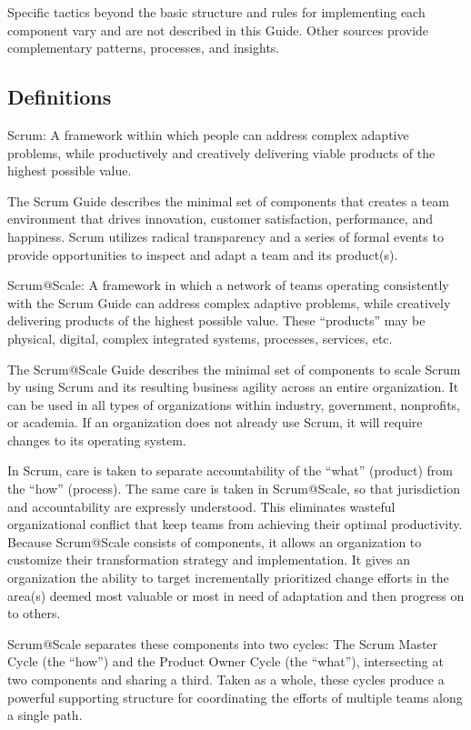 \documentclass[12pt,a4paper,parskip=full]{scrartcl}
\begin{document}
Specific tactics beyond the basic structure and rules for implementing
each component vary and are not described in this Guide. Other sources
provide complementary patterns, processes, and insights.

\subsection{Definitions}\label{definitions}

Scrum: A framework within which people can address complex adaptive
problems, while productively and creatively delivering viable products
of the highest possible value.

The Scrum Guide describes the minimal set of components that creates a
team environment that drives innovation, customer satisfaction,
performance, and happiness. Scrum utilizes radical transparency and a
series of formal events to provide opportunities to inspect and adapt a
team and its product(s).

Scrum@Scale: A framework in which a network of teams operating
consistently with the Scrum Guide can address complex adaptive problems,
while creatively delivering products of the highest possible value.
These ``products'' may be physical, digital, complex integrated systems,
processes, services, etc.

The Scrum@Scale Guide describes the minimal set of components to scale
Scrum by using Scrum and its resulting business agility across an entire
organization. It can be used in all types of organizations within
industry, government, nonprofits, or academia. If an organization does
not already use Scrum, it will require changes to its operating system.

In Scrum, care is taken to separate accountability of the ``what''
(product) from the ``how'' (process). The same care is taken in
Scrum@Scale, so that jurisdiction and accountability are expressly
understood. This eliminates wasteful organizational conflict that keep
teams from achieving their optimal productivity. Because Scrum@Scale
consists of components, it allows an organization to customize their
transformation strategy and implementation. It gives an organization the
ability to target incrementally prioritized change efforts in the
area(s) deemed most valuable or most in need of adaptation and then
progress on to others.

Scrum@Scale separates these components into two cycles: The Scrum Master
Cycle (the ``how'') and the Product Owner Cycle (the ``what''),
intersecting at two components and sharing a third. Taken as a whole,
these cycles produce a powerful supporting structure for coordinating
the efforts of multiple teams along a single path.
\end{document}
